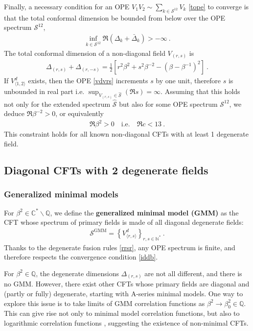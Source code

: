 \documentclass[12pt, a4paper]{article}
\newcommand{\myindex}[1]{\textbf{\boldmath #1}}
\theoremstyle{break}
\begin{document}
Finally, a necessary condition for an OPE $V_1V_2\sim \sum_{k\in\mathcal{S}^{12}}V_k$ \eqref{tope} to converge is that the total conformal dimension be bounded from below over the OPE spectrum $\mathcal{S}^{12}$,
\begin{align}
 \boxed{\inf_{k\in \mathcal{S}^{12}}\Re\left(\Delta_k+\bar\Delta_k\right) > -\infty} \ . 
 \label{iddb}
\end{align}
The total conformal dimension of a non-diagonal field $V_{(r,s)}$ is 
\begin{align}
 \Delta_{(r,s)}+\Delta_{(r,-s)} = \frac12\left[ r^2\beta^{2} + s^2\beta^{-2}  -\left(\beta-\beta^{-1}\right)^2\right]\ .
\end{align}
If $V^d_{\langle 1,2\rangle}$ exists, then the OPE \eqref{vdvrs} increments $s$ by one unit, therefore $s$ is unbounded in real part i.e. $\sup_{V_{(r,s)}\in \widehat{\mathcal{S}}} \left(\Re s\right) = \infty$. Assuming that this holds not only for the extended spectrum $\widehat{\mathcal{S}}$ but also for some OPE spectrum $\mathcal{S}^{12}$, we deduce $\Re\beta^{-2}>0$, or equivalently 
\begin{align}
 \boxed{\Re\beta^2 > 0 \quad \text{i.e.} \quad \Re c < 13}\ .
 \label{rbp}
\end{align}
This constraint holds for all known non-diagonal CFTs with at least 1 degenerate field. 

\subsection{Diagonal CFTs with 2 degenerate fields}\label{sec:diag}

\subsubsection{Generalized minimal models}\label{sec:gmm}

For $\beta^2\in\mathbb{C}^*\backslash\mathbb{Q}$, we define the \myindex{generalized minimal model (GMM)} as the CFT whose spectrum of primary fields is made of all diagonal degenerate fields:
\begin{align}
 \boxed{\mathcal{S}^\text{GMM} = \left\{ V^d_{\langle r,s\rangle}\right\}_{r,s\in\mathbb{N}^*}} \ . 
\end{align}
Thanks to the degenerate fusion rules \eqref{rrsr}, any OPE spectrum is finite, and therefore respects the convergence condition \eqref{iddb}.

For $\beta^2\in \mathbb{Q}$, the degenerate dimensions $\Delta_{(r,s)}$ are not all different, and there is no GMM. However, there exist other CFTs whose primary fields are diagonal and (partly or fully) degenerate, starting with A-series minimal models. One way to explore this issue is to take limits of GMM correlation functions as $\beta^2\to \beta^2_0\in \mathbb{Q}$. This can give rise not only to minimal model correlation functions, but also to logarithmic correlation functions \cite{rib18}, suggesting the existence of non-minimal CFTs. 
\end{document}
